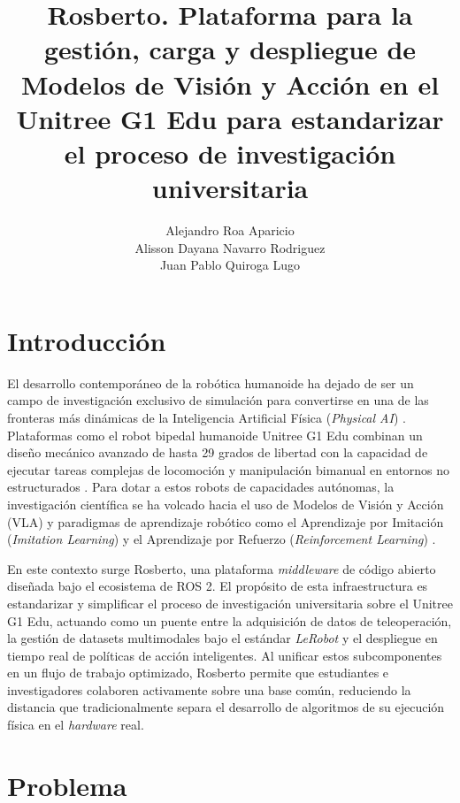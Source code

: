 \documentclass[stu,12pt,floatsintext]{apa7}
\title{Rosberto. Plataforma para la gestión, carga y despliegue de Modelos de Visión y Acción en el Unitree G1 Edu para estandarizar el proceso de investigación universitaria}
\author{Alejandro Roa Aparicio \\ Alisson Dayana Navarro Rodriguez \\ Juan Pablo Quiroga Lugo}
\affiliation{Universidad EAN}
\begin{document}
\maketitle

\tableofcontents

\clearpage
\listoffigures

\clearpage
\listoftables
\clearpage


\printglossary[type=\acronymtype]
\clearpage

\section{Introducción}

El desarrollo contemporáneo de la robótica humanoide ha dejado de ser un campo de investigación exclusivo de simulación para convertirse en una de las fronteras más dinámicas de la Inteligencia Artificial Física (\textit{Physical AI}) \parencite{bjorck2025groot}. Plataformas como el robot bipedal humanoide Unitree G1 Edu combinan un diseño mecánico avanzado de hasta 29 grados de libertad con la capacidad de ejecutar tareas complejas de locomoción y manipulación bimanual en entornos no estructurados \parencite{yan2026rapiddeployment}. Para dotar a estos robots de capacidades autónomas, la investigación científica se ha volcado hacia el uso de Modelos de Visión y Acción (VLA) y paradigmas de aprendizaje robótico como el Aprendizaje por Imitación (\textit{Imitation Learning}) y el Aprendizaje por Refuerzo (\textit{Reinforcement Learning}) \parencite{seo2025learningsimtorealhumanoidlocomotion, yan2026rapiddeployment}.

En este contexto surge Rosberto, una plataforma \textit{middleware} de código abierto diseñada bajo el ecosistema de ROS 2. El propósito de esta infraestructura es estandarizar y simplificar el proceso de investigación universitaria sobre el Unitree G1 Edu, actuando como un puente entre la adquisición de datos de teleoperación, la gestión de datasets multimodales bajo el estándar \textit{LeRobot} \parencite{cadene2026lerobotopensourcelibraryendtoend} y el despliegue en tiempo real de políticas de acción inteligentes. Al unificar estos subcomponentes en un flujo de trabajo optimizado, Rosberto permite que estudiantes e investigadores colaboren activamente sobre una base común, reduciendo la distancia que tradicionalmente separa el desarrollo de algoritmos de su ejecución física en el \textit{hardware} real.

\section{Problema}
\end{document}
